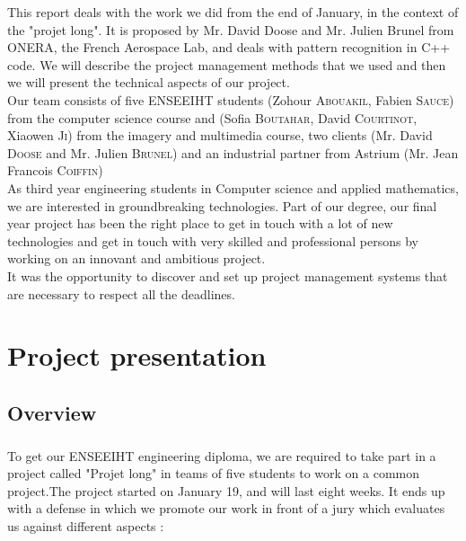 \documentclass{report}
\begin{document}
\hspace*{1cm}This report deals with the work we did from the end of 
January, in the context of the "projet long". It is proposed by Mr. David
Doose and Mr. Julien Brunel from ONERA, the French Aerospace Lab, 
and deals with pattern recognition in C++ code. We will describe the project management methods 
that we used and then we will present the technical aspects of our project.\\
\hspace*{1cm} Our team consists
 of five ENSEEIHT students (Zohour \textsc{Abouakil}, Fabien \textsc{Sauce})
from the computer science course and (Sofia \textsc{Boutahar}, David \textsc{Courtinot},
Xiaowen \textsc{Ji}) from the imagery and multimedia course, two clients (Mr. David \textsc{Doose} and Mr. Julien \textsc{Brunel})
and an industrial partner from Astrium (Mr. Jean Francois \textsc{Coiffin}) \\
\hspace*{1cm}As third year engineering students in Computer science and applied mathematics, we are interested in groundbreaking technologies. Part of our degree, our final year project has been the right place
 to get in touch with a lot of new technologies and get in touch with 
very skilled and professional persons by working on an
  innovant and ambitious project.\\
\hspace*{1cm} It was the opportunity to discover and set up
 project management systems that are necessary to respect
all the deadlines.
\chapter{Project presentation}

\section{Overview}

\paragraph{}
\hspace{4mm}\textnormal{To get our ENSEEIHT engineering diploma, we are required to 
take part in a project called "Projet long" in teams of five students 
to work on a common project.The project started on January 19, 
and will last eight weeks. It ends up with a defense in which we
 promote our work in front of a jury which evaluates us against 
different aspects :}
\end{document}

